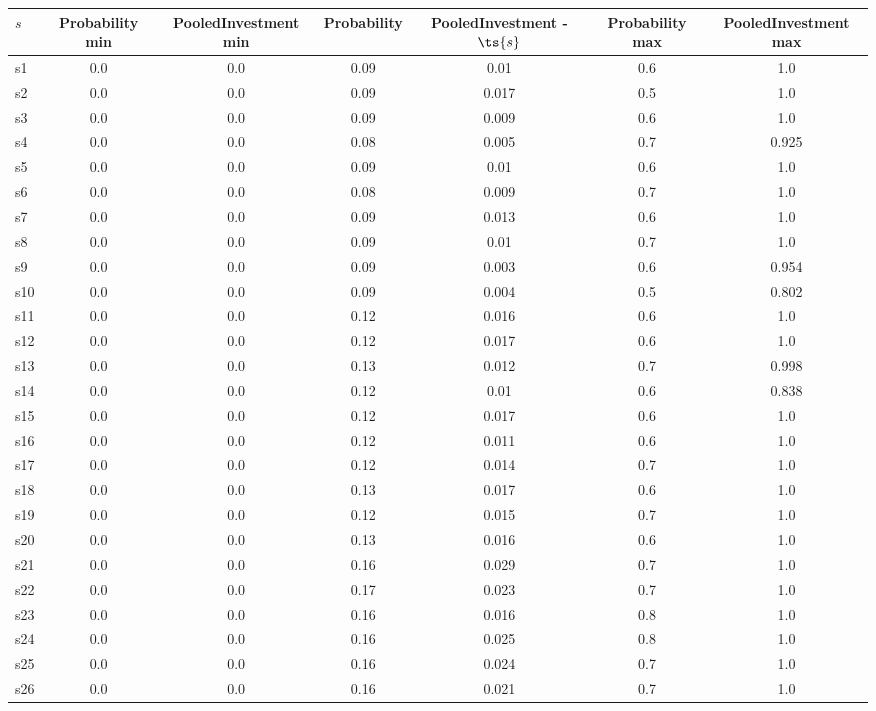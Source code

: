 \documentclass{article}
\begin{document}
\noindent\begin{tabular}{|l|c|c|c|c|c|c|}
\hline
$s$& Probability min & PooledInvestment min & Probability & PooledInvestment - $\ts{s}$ & Probability max & PooledInvestment max\\
\hline
s1 &0.0 & 0.0 & 0.09 & 0.01 & 0.6 & 1.0\\
\hline
s2 &0.0 & 0.0 & 0.09 & 0.017 & 0.5 & 1.0\\
\hline
s3 &0.0 & 0.0 & 0.09 & 0.009 & 0.6 & 1.0\\
\hline
s4 &0.0 & 0.0 & 0.08 & 0.005 & 0.7 & 0.925\\
\hline
s5 &0.0 & 0.0 & 0.09 & 0.01 & 0.6 & 1.0\\
\hline
s6 &0.0 & 0.0 & 0.08 & 0.009 & 0.7 & 1.0\\
\hline
s7 &0.0 & 0.0 & 0.09 & 0.013 & 0.6 & 1.0\\
\hline
s8 &0.0 & 0.0 & 0.09 & 0.01 & 0.7 & 1.0\\
\hline
s9 &0.0 & 0.0 & 0.09 & 0.003 & 0.6 & 0.954\\
\hline
s10 &0.0 & 0.0 & 0.09 & 0.004 & 0.5 & 0.802\\
\hline
s11 &0.0 & 0.0 & 0.12 & 0.016 & 0.6 & 1.0\\
\hline
s12 &0.0 & 0.0 & 0.12 & 0.017 & 0.6 & 1.0\\
\hline
s13 &0.0 & 0.0 & 0.13 & 0.012 & 0.7 & 0.998\\
\hline
s14 &0.0 & 0.0 & 0.12 & 0.01 & 0.6 & 0.838\\
\hline
s15 &0.0 & 0.0 & 0.12 & 0.017 & 0.6 & 1.0\\
\hline
s16 &0.0 & 0.0 & 0.12 & 0.011 & 0.6 & 1.0\\
\hline
s17 &0.0 & 0.0 & 0.12 & 0.014 & 0.7 & 1.0\\
\hline
s18 &0.0 & 0.0 & 0.13 & 0.017 & 0.6 & 1.0\\
\hline
s19 &0.0 & 0.0 & 0.12 & 0.015 & 0.7 & 1.0\\
\hline
s20 &0.0 & 0.0 & 0.13 & 0.016 & 0.6 & 1.0\\
\hline
s21 &0.0 & 0.0 & 0.16 & 0.029 & 0.7 & 1.0\\
\hline
s22 &0.0 & 0.0 & 0.17 & 0.023 & 0.7 & 1.0\\
\hline
s23 &0.0 & 0.0 & 0.16 & 0.016 & 0.8 & 1.0\\
\hline
s24 &0.0 & 0.0 & 0.16 & 0.025 & 0.8 & 1.0\\
\hline
s25 &0.0 & 0.0 & 0.16 & 0.024 & 0.7 & 1.0\\
\hline
s26 &0.0 & 0.0 & 0.16 & 0.021 & 0.7 & 1.0\\

\end{tabular}
\end{document}
